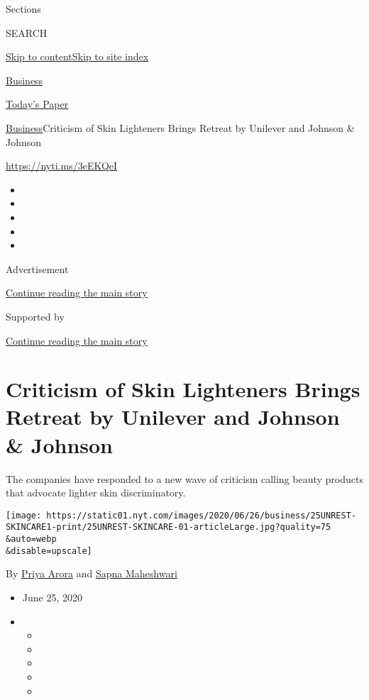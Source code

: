Sections

SEARCH

\protect\hyperlink{site-content}{Skip to
content}\protect\hyperlink{site-index}{Skip to site index}

\href{https://www.nytimes.com/section/business}{Business}

\href{https://myaccount.nytimes.com/auth/login?response_type=cookie\&client_id=vi}{}

\href{https://www.nytimes.com/section/todayspaper}{Today's Paper}

\href{/section/business}{Business}\textbar{}Criticism of Skin Lighteners
Brings Retreat by Unilever and Johnson \& Johnson

\url{https://nyti.ms/3eEKQeI}

\begin{itemize}
\item
\item
\item
\item
\item
\end{itemize}

Advertisement

\protect\hyperlink{after-top}{Continue reading the main story}

Supported by

\protect\hyperlink{after-sponsor}{Continue reading the main story}

\hypertarget{criticism-of-skin-lighteners-brings-retreat-by-unilever-and-johnson--johnson}{%
\section{Criticism of Skin Lighteners Brings Retreat by Unilever and
Johnson \&
Johnson}\label{criticism-of-skin-lighteners-brings-retreat-by-unilever-and-johnson--johnson}}

The companies have responded to a new wave of criticism calling beauty
products that advocate lighter skin discriminatory.

\texttt{[image: https://static01.nyt.com/images/2020/06/26/business/25UNREST-SKINCARE1-print/25UNREST-SKINCARE-01-articleLarge.jpg?quality=75\\\&auto=webp\\\&disable=upscale]}

By \href{https://www.nytimes.com/by/priya-arora}{Priya Arora} and
\href{https://www.nytimes.com/by/sapna-maheshwari}{Sapna Maheshwari}

\begin{itemize}
\item
  June 25, 2020
\item
  \begin{itemize}
  \item
  \item
  \item
  \item
  \item
  \end{itemize}
\end{itemize}

